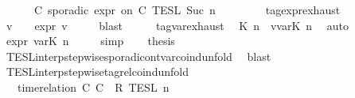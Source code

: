 \begin{isabellebody}
\isanewline
\ \ \ \ {\isasymunion}\ {\isasymlbrakk}\ C\ sporadic{\isasymsharp}\ {\isasymtau}\isactrlsub e\isactrlsub x\isactrlsub p\isactrlsub r\ on\ C\ {\isasymrbrakk}\isactrlsub T\isactrlsub E\isactrlsub S\isactrlsub L\isactrlbsup {\isasymge}\ Suc\ n\isactrlesup {\isacartoucheclose}\ \ \ %
\isanewline
%
\isadelimproof
%
\endisadelimproof
%
\isatagproof
{}\isamarkupfalse%
\ {\isacharminus}\isanewline
\ \ \isamarkupfalse%
\ tag{\isacharunderscore}expr{\isachardot}exhaust\ \isamarkupfalse%
\ v\ {\isasymtau}\ \ {\isacartoucheopen}\ {\isasymtau}\isactrlsub e\isactrlsub x\isactrlsub p\isactrlsub r{\isacharequal}{\isasymlparr}\ v\ {\isasymoplus}\ {\isasymtau}\ {\isasymrparr}{\isacartoucheclose}\ \isamarkupfalse%
\ blast\isanewline
\ \ \isamarkupfalse%
\ \isamarkupfalse%
\ tag{\isacharunderscore}var{\isachardot}exhaust\ \isamarkupfalse%
\ K\ n\ \ {\isacartoucheopen}v{\isacharequal}{\isasymtau}\isactrlsub v\isactrlsub a\isactrlsub r{\isacharparenleft}K{\isacharcomma}\ n{\isacharparenright}{\isacartoucheclose}\ \isamarkupfalse%
\ auto\isanewline
\ \ \isamarkupfalse%
\ \isamarkupfalse%
\ {\isacartoucheopen}{\isasymtau}\isactrlsub e\isactrlsub x\isactrlsub p\isactrlsub r{\isacharequal}{\isasymlparr}\ {\isasymtau}\isactrlsub v\isactrlsub a\isactrlsub r{\isacharparenleft}K{\isacharcomma}\ n{\isacharparenright}\ {\isasymoplus}\ {\isasymtau}\ {\isasymrparr}{\isacartoucheclose}\ \isamarkupfalse%
\ simp\isanewline
\ \ \isamarkupfalse%
\ {\isacharquery}thesis\ \isamarkupfalse%
\ TESL{\isacharunderscore}interp{\isacharunderscore}stepwise{\isacharunderscore}sporadicon{\isacharunderscore}tvar{\isacharunderscore}coind{\isacharunderscore}unfold\ \isamarkupfalse%
\ blast\isanewline
{}\isamarkupfalse%
%
\endisatagproof
{\isafoldproof}%
%
\isadelimproof
\isanewline
%
\endisadelimproof
\isanewline
{}\isamarkupfalse%
\ TESL{\isacharunderscore}interp{\isacharunderscore}stepwise{\isacharunderscore}tagrel{\isacharunderscore}coind{\isacharunderscore}unfold{\isacharcolon}\isanewline
\ \ {\isacartoucheopen}{\isasymlbrakk}\ time{\isacharminus}relation\ {\isasymlfloor}C\ C\ {\isasymin}\ R\ {\isasymrbrakk}\isactrlsub T\isactrlsub E\isactrlsub S\isactrlsub L\isactrlbsup {\isasymge}\ n\isactrlesup \ {\isacharequal}\ \ \ \ \ \ \ \ %

\end{isabellebody}
